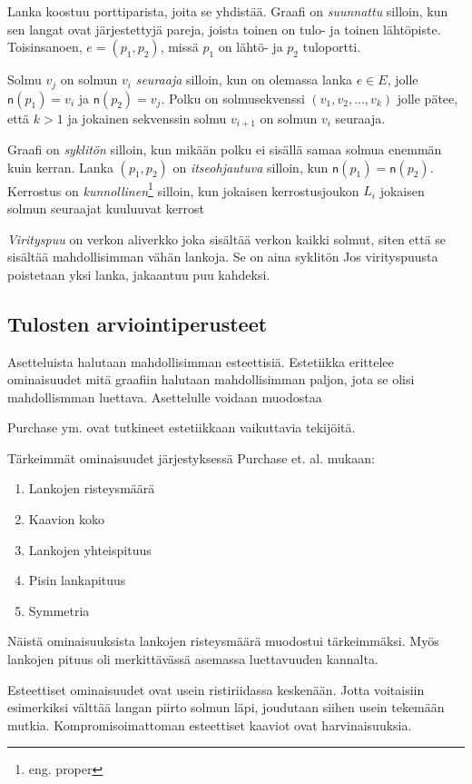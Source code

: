 \documentclass[finnish,12pt]{article}
\begin{document}
Lanka koostuu porttiparista, joita se yhdistää. Graafi on \emph{suunnattu} silloin, kun sen langat ovat järjestettyjä pareja, joista toinen on tulo- ja toinen lähtöpiste. Toisinsanoen, $e = (p_1, p_2)$, missä $p_1$ on lähtö- ja $p_2$ tuloportti.

Solmu $v_j$ on solmun $v_i$ \emph{seuraaja} silloin, kun on olemassa lanka $e \in E$, jolle $\mathsf{n}(p_1) = v_i$ ja $\mathsf{n}(p_2) = v_j$.
Polku on solmusekvenssi $(v_1, v_2, ..., v_k)$ jolle pätee, että $k>1$ ja jokainen sekvenssin solmu $v_{i+1}$ on solmun $v_i$ seuraaja.

Graafi on \emph{syklitön} silloin, kun mikään polku ei sisällä samaa solmua enemmän kuin kerran.
Lanka $(p_1, p_2)$ on \emph{itseohjautuva} silloin, kun $\mathsf{n}(p_1) = \mathsf{n}(p_2)$.
Kerrostus on \emph{kunnollinen}\footnote{eng. proper} silloin, kun jokaisen kerrostusjoukon $L_i$ jokaisen solmun seuraajat kuuluuvat kerrost

\emph{Virityspuu} on verkon aliverkko joka sisältää verkon kaikki solmut, siten että se sisältää mahdollisimman vähän lankoja.
Se on aina syklitön
Jos virityspuusta poistetaan yksi lanka, jakaantuu puu kahdeksi.

 		\subsection{Tulosten arviointiperusteet}

Asetteluista halutaan mahdollisimman esteettisiä.
Estetiikka erittelee ominaisuudet mitä graafiin halutaan mahdollisimman paljon, jota se olisi mahdollismman luettava.
Asettelulle voidaan muodostaa 

Purchase ym. ovat tutkineet estetiikkaan vaikuttavia tekijöitä. \cite{RefWorks:47}

Tärkeimmät ominaisuudet järjestyksessä Purchase et. al. mukaan: 
\begin{enumerate}
  \item Lankojen risteysmäärä
  \item Kaavion koko
  \item Lankojen yhteispituus
  \item Pisin lankapituus
  \item Symmetria
\end{enumerate}

Näistä ominaisuuksista lankojen risteysmäärä muodostui tärkeimmäksi. Myös lankojen pituus oli merkittävässä asemassa luettavuuden kannalta.

Esteettiset ominaisuudet ovat usein ristiriidassa keskenään.
Jotta voitaisiin esimerkiksi välttää langan piirto solmun läpi, joudutaan siihen usein tekemään mutkia.
Kompromisoimattoman esteettiset kaaviot ovat harvinaisuuksia.
\end{document}
